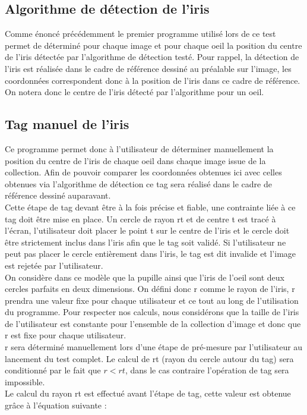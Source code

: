 \documentclass[a4paper, 12pt]{report}
\begin{document}
\subsection{Algorithme de détection de l'iris}
Comme énoncé précédemment le premier programme utilisé lors de ce test permet de déterminé pour chaque image et pour chaque oeil la position du centre de l'iris détectée par l'algorithme de détection testé. Pour rappel, la détection de l'iris est réalisée dans le cadre de référence dessiné au préalable sur l'image, les coordonnées correspondent donc à la position de l'iris dans ce cadre de référence. On notera donc le centre de l'iris détecté par l'algorithme pour un oeil.

\subsection{Tag manuel de l'iris}
Ce programme permet donc à l'utilisateur de déterminer manuellement la position du centre de l'iris de chaque oeil dans chaque image issue de la collection. Afin de pouvoir comparer les coordonnées obtenues ici avec celles obtenues via l'algorithme de détection ce tag sera réalisé dans le cadre de référence dessiné auparavant. \\ 
Cette étape de tag devant être à la fois précise et fiable, une contrainte liée à ce tag doit être mise en place. Un cercle de rayon rt et de centre t est tracé à l'écran, l'utilisateur doit placer le point t sur le centre de l'iris et le cercle doit être strictement inclus dans l'iris afin que le tag soit validé. Si l'utilisateur ne peut pas placer le cercle entièrement dans l'iris, le tag est dit invalide et l'image est rejetée par l'utilisateur.\\ 
On considère dans ce modèle que la pupille ainsi que l'iris de l'oeil sont deux cercles parfaits en deux dimensions. On défini donc r comme le rayon de l'iris, r prendra une valeur fixe pour chaque utilisateur et ce tout au long de l'utilisation du programme. Pour respecter nos calculs, nous considérons que la taille de l'iris de l'utilisateur est constante pour l'ensemble de la collection d'image et donc que r est fixe pour chaque utilisateur. \\
r sera déterminé manuellement lors d'une étape de pré-mesure par l'utilisateur au lancement du test complet. Le calcul de rt (rayon du cercle autour du tag) sera conditionné par le fait que $r<rt$, dans le cas contraire l'opération de tag sera impossible.\\
Le calcul du rayon rt est effectué avant l'étape de tag, cette valeur est obtenue grâce à l'équation suivante : \\
\end{document}
